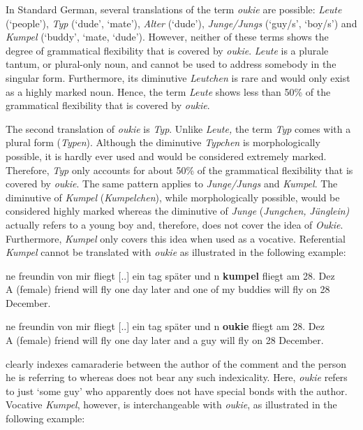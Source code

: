 \documentclass[output=paper]{langsci/langscibook}
\begin{document}
In Standard German, several translations of the term \textit{oukie} are possible: \textit{Leute} (‘people’), \textit{Typ} (‘dude’, ‘mate’), \textit{Alter} (‘dude’), \textit{Junge/Jungs} (‘guy/s’, ‘boy/s’) and \textit{Kumpel} (‘buddy’, ‘mate, ‘dude’). However, neither of these terms shows the degree of grammatical flexibility that is covered by \textit{oukie}. \textit{Leute} is a plurale tantum, or plural-only noun, and cannot be used to address somebody in the singular form. Furthermore, its diminutive \textit{Leutchen} is rare and would only exist as a highly marked noun. Hence, the term \textit{Leute} shows less than 50\% of the grammatical flexibility that is covered by \textit{oukie}.

The second translation of \textit{oukie} is \textit{Typ}. Unlike \textit{Leute,} the term \textit{Typ} comes with a plural form (\textit{Typen}). Although the diminutive \textit{Typchen} is morphologically possible, it is hardly ever used and would be considered extremely marked. Therefore, \textit{Typ} only accounts for about 50\% of the grammatical flexibility that is covered by \textit{oukie}. The same pattern applies to \textit{Junge/Jungs} and \textit{Kumpel}. The diminutive of \textit{Kumpel} (\textit{Kumpelchen}), while morphologically possible, would be considered highly marked whereas the diminutive of \textit{Junge} (\textit{Jungchen,} \textit{Jünglein)} actually refers to a young boy and, therefore, does not cover the idea of \textit{Oukie}. Furthermore, \textit{Kumpel} only covers this idea when used as a vocative. Referential \textit{Kumpel} cannot be translated with \textit{oukie} as illustrated in the following example: 

\ea\label{ex:radke:18}
 ne freundin von mir fliegt [..] ein tag später und n \textbf{kumpel} fliegt am 28. Dez\\
A (female) friend will fly one day later and one of my buddies will fly on 28 December.\\
\z


\ea\label{ex:radke:19}
 ne freundin von mir fliegt [..] ein tag später und n \textbf{oukie} fliegt am 28. Dez\\
A (female) friend will fly one day later and a guy will fly on 28 December.\\
\z

 clearly indexes camaraderie between the author of the comment and the person he is referring to whereas  does not bear any such indexicality. Here, \textit{oukie} refers to just ‘some guy’ who apparently does not have special bonds with the author. Vocative \textit{Kumpel}, however, is interchangeable with \textit{oukie}, as illustrated in the following example:
\end{document}
